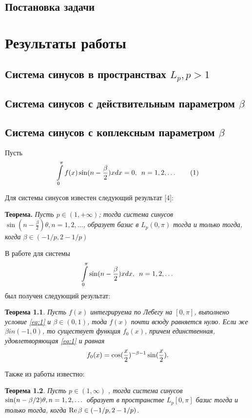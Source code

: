 ﻿\documentclass[oneside, final, 14pt]{extreport}
\newtheorem{theorem}{Теорема}
\begin{document}
	
	
\section{Постановка задачи}


\chapter*{Результаты работы}

\section{Система синусов в пространствах $L_p, p > 1$}

\section{Система синусов с действительным параметром $\beta$}

\section{Система синусов с коплексным параметром $\beta$}

Пусть \begin{equation}\int\limits_0^{\pi}f(x)\sin(n - \frac{\beta}{2})xdx = 0, \enspace n = 1, 2, \dots \tag{1} \label{eq:1}\end{equation}
	
	Для системы синусов известен следующий результат [4]:
	
	\medskip
	\textbf{Теорема.} \itshape Пусть $p \in (1, +\infty)$; тогда система синусов 
	$\sin(n - \frac{\beta}{2})\theta, n = 1, 2, \ldots$, 
	образует базис в $L_p(0, \pi)$ тогда и только тогда, 
	когда $\beta \in (-1/p, 2 - 1/p)$
	\normalfont

	В работе \cite{moi:gul} для системы 
	$$\int\limits_0^{\pi}\sin(n - \frac{\beta}{2})xdx, \enspace n = 1, 2, \dots$$ 
	был получен следующий результат:
	
	\begin{theorem}
		Пусть $f(x)$ интегрируема по Лебегу на $[0, \pi]$, выполнено условие
		\eqref{eq:1} и $\beta \in (0, 1)$, тода $f(x)$ почти всюду равняется нулю. 
		Если же  $\beta in (-1, 0)$, то существует функция $f_0(x)$, причем
		единственная, удовлетворяющая \eqref{eq:1} и равная $$f_0(x) = \cos(\frac{x}{2})^{-\beta-1}\sin(\frac{x}{2}).$$
	\end{theorem}
	
	Также из работы  \cite{dev:dis} известно:
	\begin{theorem}
		Пусть $p \in (1, \infty)$ , тогда система синусов $\sin(n - \beta / 2)\theta, \\
		n = 1, 2, \dots$ образует в пространстве $L_p[0, \pi]$ базис тогда и только тогда, 
		когда $\operatorname{Re}\beta \in (-1/p, 2 - 1/p)$.
	\end{theorem}
	
\end{document}
